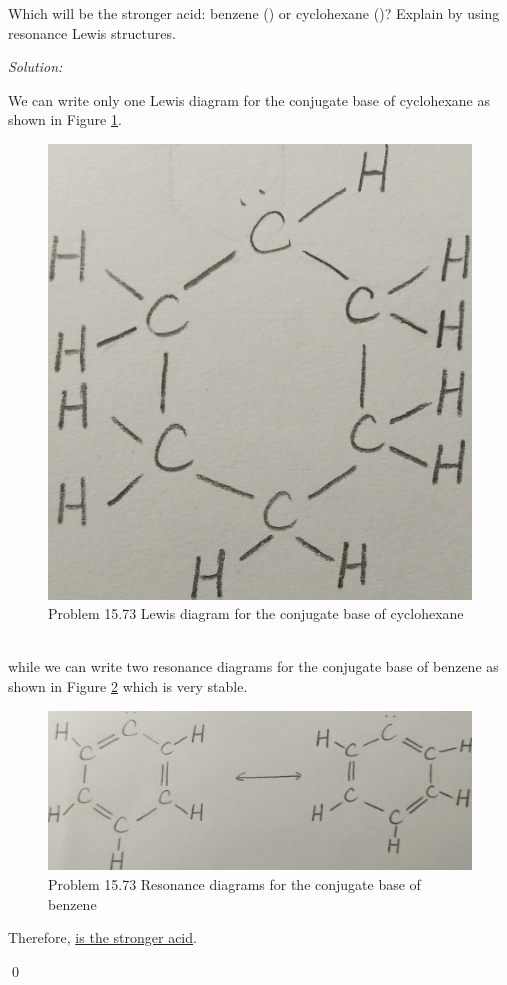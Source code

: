 \documentclass[12pt]{article}
\newenvironment{problem}[2][Problem]{\begin{trivlist}
\item[\hskip \labelsep {\bfseries #1}\hskip \labelsep {\bfseries #2.}]}{\end{trivlist}}
\newenvironment{sol}
    {\emph{Solution:}
    }
    {
    \qed
    }
\begin{document}
\begin{problem}{15.73}
Which will be the stronger acid: benzene () or cyclohexane ()? Explain by using resonance Lewis structures.
\end{problem}
\begin{sol}
We can write only one Lewis diagram for the conjugate base of cyclohexane as shown in Figure \ref{1}.
\begin{figure}[h]
\centering
\includegraphics[scale=.1]{15_73_1.jpg}
\caption{Problem 15.73 Lewis diagram for the conjugate base of cyclohexane}\label{1}
\end{figure}
\\while we can write two resonance diagrams for the conjugate
base of benzene as shown in Figure \ref{2} which is very stable.
\begin{figure}[h]
\centering
\includegraphics[scale=.1]{15_73_2.jpg}
\caption{Problem 15.73 Resonance diagrams for the conjugate
base of benzene}\label{2}
\end{figure}
Therefore, \uline{ is the stronger acid}.
\end{sol}
\end{document}
